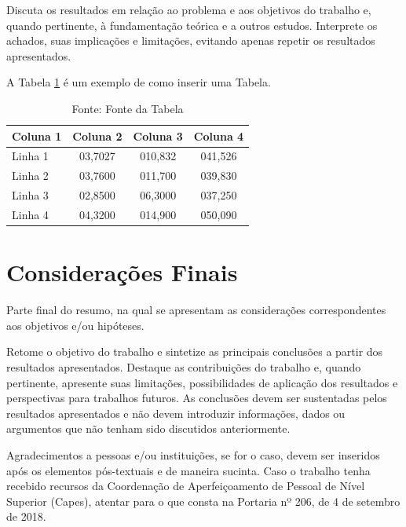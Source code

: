 \documentclass[a4paper, 12pt, twoside]{article}
\begin{document}
Discuta os resultados em relação ao problema e aos objetivos do trabalho e,
quando pertinente, à fundamentação teórica e a outros estudos. Interprete os
achados, suas implicações e limitações, evitando apenas repetir os resultados
apresentados.

A Tabela \ref{tab:salario} é um exemplo de como inserir uma Tabela.

\begin{table}[ht]
\caption{Título da Tabela.}
\label{tab:salario}
\centering
\begin{tabular}{lccc}
\toprule
\textbf{Coluna 1} & \textbf{Coluna 2} & \textbf{Coluna 3} & \textbf{Coluna 4} \\
\midrule
Linha 1                    & 03,7027 & 010,832 & 041,526 \\
Linha 2                  & 03,7600 & 011,700 & 039,830 \\
Linha 3                   & 02,8500 & 06,3000 & 037,250 \\
Linha 4                  & 04,3200 & 014,900 & 050,090 \\
\bottomrule
\end{tabular}
\caption*{Fonte: Fonte da Tabela}
\end{table}

\section{Considerações Finais}

Parte final do resumo, na qual se apresentam as considerações correspondentes
aos objetivos e/ou hipóteses.

Retome o objetivo do trabalho e sintetize as principais conclusões a partir dos
resultados apresentados. Destaque as contribuições do trabalho e, quando
pertinente, apresente suas limitações, possibilidades de aplicação dos
resultados e perspectivas para trabalhos futuros. As conclusões devem ser
sustentadas pelos resultados apresentados e não devem introduzir informações,
dados ou argumentos que não tenham sido discutidos anteriormente.


Agradecimentos a pessoas e/ou instituições, se for o caso, devem ser inseridos após os elementos pós-textuais e de maneira sucinta. Caso o trabalho tenha recebido recursos da Coordenação de Aperfeiçoamento de Pessoal de Nível Superior (Capes), atentar para o que consta na Portaria nº 206, de 4 de setembro de 2018. 


\printbibliography
\end{document}
